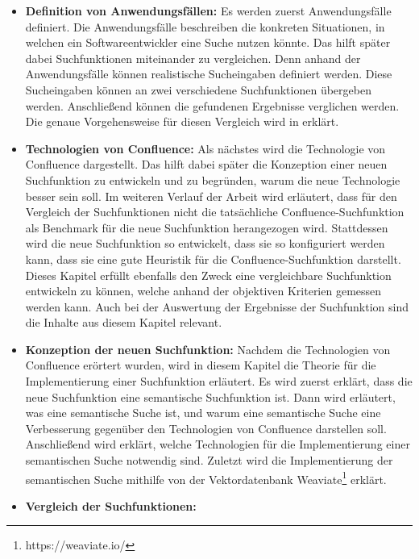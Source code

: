 \begin{itemize}
   \item \textbf{Definition von Anwendungsfällen:}
         Es werden zuerst Anwendungsfälle definiert.
         Die Anwendungsfälle beschreiben die konkreten Situationen, in welchen ein Softwareentwickler eine Suche nutzen könnte.
         Das hilft später dabei Suchfunktionen miteinander zu vergleichen.
         Denn anhand der Anwendungsfälle können realistische Sucheingaben definiert werden.
         Diese Sucheingaben können an zwei verschiedene Suchfunktionen übergeben werden.
         Anschließend können die gefundenen Ergebnisse verglichen werden.
         Die genaue Vorgehensweise für diesen Vergleich wird in  erklärt.
   \item \textbf{Technologien von Confluence:}
         Als nächstes wird die Technologie von Confluence dargestellt.
         Das hilft dabei später die Konzeption einer neuen Suchfunktion zu entwickeln und zu begründen, warum die neue Technologie besser sein soll.
         Im weiteren Verlauf der Arbeit wird erläutert, dass für den Vergleich der Suchfunktionen nicht die tatsächliche Confluence-Suchfunktion als Benchmark für die neue Suchfunktion herangezogen wird.
         Stattdessen wird die neue Suchfunktion so entwickelt, dass sie so konfiguriert werden kann, dass sie eine gute Heuristik für die Confluence-Suchfunktion darstellt.
         Dieses Kapitel erfüllt ebenfalls den Zweck eine vergleichbare Suchfunktion entwickeln zu können, welche anhand der objektiven Kriterien gemessen werden kann.
         Auch bei der Auswertung der Ergebnisse der Suchfunktion sind die Inhalte aus diesem Kapitel relevant.
   \item \textbf{Konzeption der neuen Suchfunktion:}
         Nachdem die Technologien von Confluence erörtert wurden, wird in diesem Kapitel die Theorie für die Implementierung einer Suchfunktion erläutert.
         Es wird zuerst erklärt, dass die neue Suchfunktion eine semantische Suchfunktion ist.
         Dann wird erläutert, was eine semantische Suche ist, und warum eine semantische Suche eine Verbesserung gegenüber den Technologien von Confluence darstellen soll.
         Anschließend wird erklärt, welche Technologien für die Implementierung einer semantischen Suche notwendig sind.
         Zuletzt wird die Implementierung der semantischen Suche mithilfe von der Vektordatenbank Weaviate\footnote{https://weaviate.io/} erklärt.
   \item \textbf{Vergleich der Suchfunktionen:}

\end{itemize}
